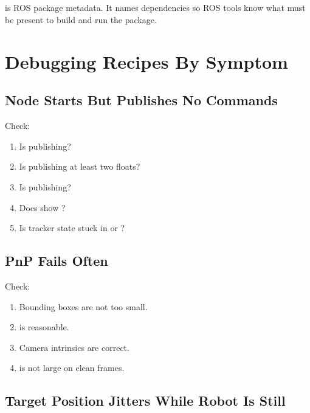 \subsection{}

 is ROS package metadata. It names dependencies so ROS tools
know what must be present to build and run the package.

\section{Debugging Recipes By Symptom}

\subsection{Node Starts But Publishes No Commands}

Check:

\begin{enumerate}
  \item Is  publishing?
  \item Is  publishing at least two floats?
  \item Is  publishing?
  \item Does  show ?
  \item Is tracker state stuck in  or ?
\end{enumerate}

\subsection{PnP Fails Often}

Check:

\begin{enumerate}
  \item Bounding boxes are not too small.
  \item {} is reasonable.
  \item Camera intrinsics are correct.
  \item {} is not large on clean frames.
\end{enumerate}

\subsection{Target Position Jitters While Robot Is Still}

